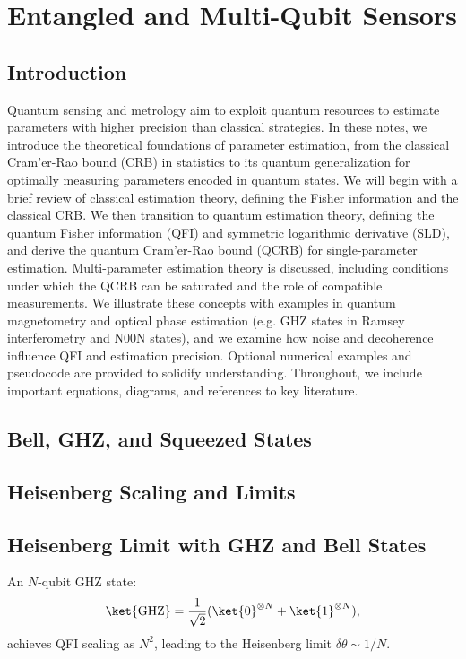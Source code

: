 \chapter{Entangled and Multi-Qubit Sensors}

\section{Introduction}



Quantum sensing and metrology aim to exploit quantum resources to
estimate parameters with higher precision than classical
strategies. In these notes, we introduce the theoretical foundations
of parameter estimation, from the classical Cram'er-Rao bound (CRB) in
statistics to its quantum generalization for optimally measuring
parameters encoded in quantum states. We will begin with a brief
review of classical estimation theory, defining the Fisher information
and the classical CRB. We then transition to quantum estimation
theory, defining the quantum Fisher information (QFI) and symmetric
logarithmic derivative (SLD), and derive the quantum Cram'er-Rao bound
(QCRB) for single-parameter estimation. Multi-parameter estimation
theory is discussed, including conditions under which the QCRB can be
saturated and the role of compatible measurements. We illustrate these
concepts with examples in quantum magnetometry and optical phase
estimation (e.g. GHZ states in Ramsey interferometry and N00N states),
and we examine how noise and decoherence influence QFI and estimation
precision. Optional numerical examples and pseudocode are provided to
solidify understanding. Throughout, we include important equations,
diagrams, and references to key literature.


\section{Bell, GHZ, and Squeezed States}
\section{Heisenberg Scaling and Limits}

\section{Heisenberg Limit with GHZ and Bell States}

An $N$-qubit GHZ state:
\[
\ket{\text{GHZ}} = \frac{1}{\sqrt{2}}(\ket{0}^{\otimes N} + \ket{1}^{\otimes N}),
\]
achieves QFI scaling as $N^2$, leading to the Heisenberg limit $\delta\theta \sim 1/N$.


